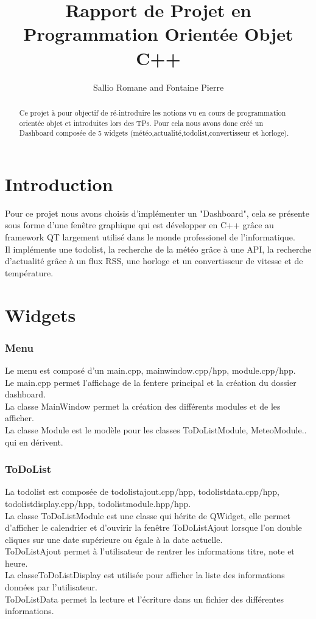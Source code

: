 \documentclass[12pt]{report}
\title{Rapport de Projet en Programmation Orientée Objet C++}
\author{Sallio Romane and Fontaine Pierre}
\begin{document}
  \maketitle
  \newpage
  \tableofcontents
  \begin{abstract}
    Ce projet à pour objectif de ré-introduire les notions vu en cours de programmation orientée objet et introduites lors des TPs. Pour cela nous avons donc créé un Dashboard composée de 5 widgets (météo,actualité,todolist,convertisseur et horloge).  
  \end{abstract}
  \newpage
  \part{Introduction}
    Pour ce projet nous avons choisis d'implémenter un "Dashboard", cela se présente sous forme d'une fenêtre graphique qui est développer en C++ grâce au framework QT largement utilisé dans le monde professionel de l'informatique.\\
    Il implémente une todolist, la recherche de la météo grâce à une API, la recherche d'actualité grâce à un flux RSS, une horloge et un convertisseur de vitesse et de température.
  \part{Widgets}
  \section{Menu}
    Le menu est composé d'un main.cpp, mainwindow.cpp/hpp, module.cpp/hpp.\\
    Le main.cpp permet l'affichage de la fentere principal et la création du dossier dashboard.\\
    La classe MainWindow permet la création des différents modules et de les afficher.\\
    La classe Module est le modèle pour les classes ToDoListModule, MeteoModule.. qui en dérivent.\\
  \section{ToDoList}
    La todolist est composée de todolistajout.cpp/hpp, todolistdata.cpp/hpp, todolistdisplay.cpp/hpp, todolistmodule.hpp/hpp.\\
    La classe ToDoListModule est une classe qui hérite de QWidget, elle permet d'afficher le calendrier et d'ouvirir la fenêtre ToDoListAjout lorsque l'on double cliques sur une date supérieure ou égale à la date actuelle.\\
    ToDoListAjout permet à l'utilisateur de rentrer les informations titre, note et heure.\\
    La classeToDoListDisplay est utilisée pour afficher la liste des informations données par l'utilisateur.\\
    ToDoListData permet la lecture et l'écriture dans un fichier des différentes informations.
\end{document}
